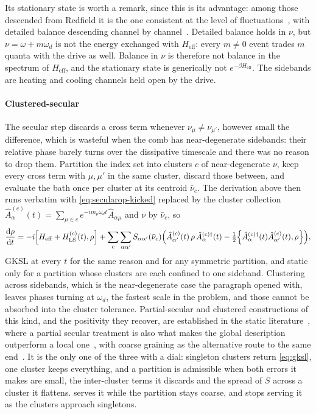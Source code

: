 \documentclass[a4paper,11pt]{article}
\newcommand{\eff}{\mathrm{eff}}
\begin{document}
Its stationary state is worth a remark, since this is its advantage: among those descended from Redfield it is the one consistent at the level of fluctuations~\cite{Soret2022Thermodynamic,Tupkary2022Fundamental}, with detailed balance descending channel by channel~\cite{Szczygielski2013Markovian}. Detailed balance holds in $\nu$, but $\nu = \omega + m\omega_d$ is not the energy exchanged with $H_\eff$: every $m\neq0$ event trades $m$ quanta with the drive as well. Balance in $\nu$ is therefore not balance in the spectrum of $H_\eff$, and the stationary state is generically not $e^{-\beta H_\eff}$. The sidebands are heating and cooling channels held open by the drive.

\paragraph{Clustered-secular}
The secular step discards a cross term whenever $\nu_\mu\neq\nu_{\mu'}$, however small the difference, which is wasteful when the comb has near-degenerate sidebands: their relative phase barely turns over the dissipative timescale and there was no reason to drop them. Partition the index set into clusters $c$ of near-degenerate $\nu$, keep every cross term with $\mu,\mu'$ in the same cluster, discard those between, and evaluate the bath once per cluster at its centroid $\bar\nu_c$. The derivation above then runs verbatim with \eqref{eq:secularop-kicked} replaced by the cluster collection $\hat A_\alpha^{(c)}(t) = \sum_{\mu\in c}e^{-i m_\mu\omega_d t}\hat A_{\alpha\mu}$ and $\nu$ by $\bar\nu_c$, so
\begin{equation}\label{eq:gksl-cluster}
  \dv{\rho}{t} = -i\comm{H_\eff + H^{(c)}_{\mathrm{LS}}(t)}{\rho}
  + \sum_{c}\sum_{\alpha\alpha'} S_{\alpha\alpha'}(\bar\nu_c)
  \Big( \hat A^{(c)}_{\alpha'}(t)\,\rho\,\hat A^{(c)\dagger}_{\alpha}(t)
  - \tfrac12\acomm{\hat A^{(c)\dagger}_{\alpha}(t)\hat A^{(c)}_{\alpha'}(t)}{\rho} \Big),
\end{equation}
GKSL at every $t$ for the same reason and for any symmetric partition, and static only for a partition whose clusters are each confined to one sideband. Clustering across sidebands, which is the near-degenerate case the paragraph opened with, leaves phases turning at $\omega_d$, the fastest scale in the problem, and those cannot be absorbed into the cluster tolerance. Partial-secular and clustered constructions of this kind, and the positivity they recover, are established in the static literature~\cite{Farina2019Open,Trushechkin2021Unified}, where a partial secular treatment is also what makes the global description outperform a local one~\cite{Cattaneo2019Local}, with coarse graining as the alternative route to the same end~\cite{Majenz2013Coarse,Cresser2017Coarse}. It is the only one of the three with a dial: singleton clusters return \eqref{eq:gksl}, one cluster keeps everything, and a partition is admissible when both errors it makes are small, the inter-cluster terms it discards and the spread of $S$ across a cluster it flattens.  serves it while the partition stays coarse, and stops serving it as the clusters approach singletons.
\end{document}
